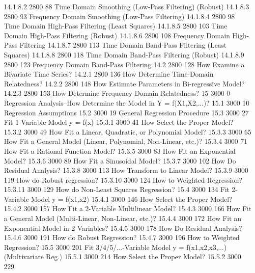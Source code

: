 14.1.8.2        2800        88
Time Domain Smoothing (Low-Pass Filtering) (Robust)
14.1.8.3        2800        93
Frequency Domain Smoothing (Low-Pass Filtering)
14.1.8.4        2800        98
Time Domain High-Pass Filtering (Least Squares)
14.1.8.5        2800       103
Time Domain High-Pass Filtering (Robust)
14.1.8.6        2800       108
Frequency Domain High-Pass Filtering
14.1.8.7        2800       113
Time Domain Band-Pass Filtering (Least Squares)
14.1.8.8        2800       118
Time Domain Band-Pass Filtering (Robust)
14.1.8.9        2800       123
Frequency Domain Band-Pass Filtering
14.2            2800       128
How Examine a Bivariate Time Series?
14.2.1          2800       136
How Determine Time-Domain Relatedness?
14.2.2          2800       148
How Estimate Parameters in Bi-regressive Model?
14.2.3          2800       153
How Determine Frequency-Domain Relatedness?
15              3000         0
Regression Analysis--How Determine the Model in Y = f(X1,X2,...)?
15.1            3000        10
Regression Assumptions
15.2            3000        19
General Regression Procedure
15.3            3000        27
Fit 1-Variable Model y = f(x)
15.3.1          3000        41
How Select the Proper Model?
15.3.2          3000        49
How Fit a Linear, Quadratic, or Polynomial Model?
15.3.3          3000        65
How Fit a General Model (Linear, Polynomial, Non-Linear, etc.)?
15.3.4          3000        71
How Fit a Rational Function Model?
15.3.5          3000        83
How Fit an Exponential Model?
15.3.6          3000        89
How Fit a Sinusoidal Model?
15.3.7          3000       102
How Do Residual Analysis?
15.3.8          3000       113
How Transform to Linear Model?
15.3.9          3000       119
How do Robust regression?
15.3.10         3000       124
How to Weighted Regression?
15.3.11         3000       129
How do Non-Least Squares Regression?
15.4            3000       134
Fit 2-Variable Model y = f(x1,x2)
15.4.1          3000       146
How Select the Proper Model?
15.4.2          3000       157
How Fit a 2-Variable Multilinear Model?
15.4.3          3000       166
How Fit a General Model (Multi-Linear, Non-Linear, etc.)?
15.4.4          3000       172
How Fit an Exponential Model in 2 Variables?
15.4.5          3000       178
How Do Residual Analysis?
15.4.6          3000       191
How do Robust Regression?
15.4.7          3000       196
How to Weighted Regression?
15.5            3000       201
Fit 3/4/5/...-Variable Model y = f(x1,x2,x3,...) (Multivariate Reg.)
15.5.1          3000       214
How Select the Proper Model?
15.5.2          3000       229
